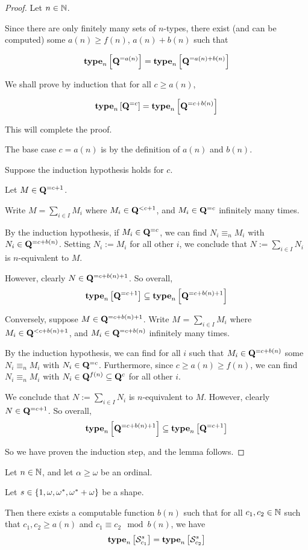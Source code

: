 \begin{proof}
    Let $n \in \mathbb{N}$.

    Since there are only finitely many sets of $n$-types,
    there exist (and can be computed)
    some $a(n) \ge f(n)$, $a(n) + b(n)$ such that

    \[
        \mathbf{type}_{n} \left[ {\mathbf{Q}^{= a(n)}} \right] = \mathbf{type}_{n} \left[ {\mathbf{Q}^{= a(n) + b(n)}} \right]
    \]

    We shall prove by induction that for all $c \ge a(n)$,

    \[\mathbf{type}_{n} \left[ {\mathbf{Q}^{= c}} \right] = \mathbf{type}_{n} \left[ {\mathbf{Q}^{= c + b(n)}} \right]\]

    This will complete the proof.

    The base case $c = a(n)$ is by the definition of $a(n)$ and $b(n)$.

    Suppose the induction hypothesis holds for $c$.

    Let $M \in \mathbf{Q}^{= c + 1}$.

    Write $M = \sum_{i \in I} M_i$ where $M_i \in \mathbf{Q}^{< c + 1}$,
    and $M_i \in \mathbf{Q}^{= c}$ infinitely many times.

    By the induction hypothesis,
    if $M_i \in \mathbf{Q}^{= c}$, we can find $N_i \equiv_n M_i$ with $N_i \in \mathbf{Q}^{= c + b(n)}$.
    Setting $N_i := M_i$ for all other $i$, we conclude that $N := \sum_{i \in I} N_i$
    is $n$-equivalent to $M$.

    However, clearly $N \in \mathbf{Q}^{= c + b(n) + 1}$. So overall,
    \[\mathbf{type}_{n} \left[ {\mathbf{Q}^{= c + 1}} \right] \subseteq \mathbf{type}_{n} \left[ {\mathbf{Q}^{= c + b(n) + 1}} \right]\]

    Conversely, suppose $M \in \mathbf{Q}^{= c + b(n) + 1}$.
    Write $M$ = $\sum_{i \in I} M_i$ where $M_i \in \mathbf{Q}^{< c + b(n) + 1}$,
    and $M_i \in \mathbf{Q}^{= c + b(n)}$ infinitely many times.

    By the induction hypothesis,
    we can find for all $i$ such that $M_i \in \mathbf{Q}^{= c + b(n)}$ some
    $N_i \equiv_n M_i$ with $N_i \in \mathbf{Q}^{= c}$.
    Furthermore, since $c \ge a(n) \ge f(n)$, we can
    find $N_i \equiv_n M_i$ with $N_i \in \mathbf{Q}^{f(n)} \subseteq \mathbf{Q}^{c}$ for all other $i$.

    We conclude that $N := \sum_{i \in I} N_i$ is $n$-equivalent to $M$.
    However, clearly $N \in \mathbf{Q}^{= c + 1}$. So overall,
    \[\mathbf{type}_{n} \left[ {\mathbf{Q}^{= c + b(n) + 1}} \right] \subseteq \mathbf{type}_{n} \left[ {\mathbf{Q}^{= c + 1}} \right]\]

    So we have proven the induction step, and the lemma follows.
\end{proof}

\begin{corollary}
    Let $n \in \mathbb{N}$, and let $\alpha \ge \omega$ be an ordinal.

    Let $s \in \left\{ {1, \omega, \omega^\ast, \omega^\ast + \omega} \right\}$ be a shape.

    Then there exists a computable function $b(n)$ such that
    for all $c_1, c_2 \in \mathbb{N}$ such that $c_1, c_2 \ge a(n)$ and $c_1 \equiv c_2 \mod b(n)$,
    we have
    \[\mathbf{type}_{n} \left[ {\mathcal{S}^{s}_{c_1}} \right] = \mathbf{type}_{n} \left[ {\mathcal{S}^{s}_{c_2}} \right]\]
\end{corollary}

